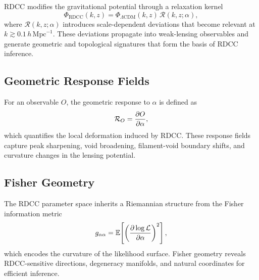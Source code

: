 \documentclass[11pt,a4paper]{article}
\begin{document}
RDCC modifies the gravitational potential through a relaxation kernel
\begin{equation}
    \Phi_{\mathrm{RDCC}}(k,z)
    =
    \Phi_{\Lambda\mathrm{CDM}}(k,z)\,
    \mathcal{R}(k,z;\alpha),
\end{equation}
where $\mathcal{R}(k,z;\alpha)$ introduces scale-dependent deviations that become
relevant at $k \gtrsim 0.1\,h\,\mathrm{Mpc}^{-1}$. These deviations propagate into
weak-lensing observables and generate geometric and topological signatures that
form the basis of RDCC inference.

\subsection{Geometric Response Fields}

For an observable $O$, the geometric response to $\alpha$ is defined as
\begin{equation}
    \mathcal{R}_{O}
    =
    \pdv{O}{\alpha},
\end{equation}
which quantifies the local deformation induced by RDCC. These response fields
capture peak sharpening, void broadening, filament-void boundary shifts, and
curvature changes in the lensing potential.

\subsection{Fisher Geometry}

The RDCC parameter space inherits a Riemannian structure from the Fisher
information metric
\begin{equation}
    g_{\alpha\alpha}
    =
    \mathbb{E}\!\left[
        \left(
            \pdv{\log \mathcal{L}}{\alpha}
        \right)^{2}
    \right],
\end{equation}
which encodes the curvature of the likelihood surface. Fisher geometry reveals
RDCC-sensitive directions, degeneracy manifolds, and natural coordinates for
efficient inference.

\end{document}
